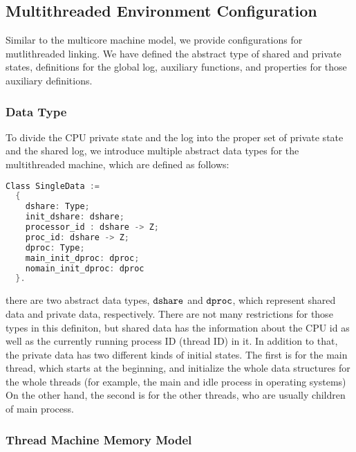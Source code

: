 
\subsection{Multithreaded Environment Configuration}
\label{chapter:linking:subsec:multithreaded-env-configuration}

Similar to the multicore machine model, we provide configurations 
for mutlithreaded linking. 
We have defined the abstract type of 
shared and private states, 
definitions for the global log, 
auxiliary functions,
and properties for those auxiliary definitions. 

\subsubsection{Data Type} 
To divide the CPU private state and the log into the proper set of private state and the shared log, we introduce 
multiple abstract data types for the multithreaded machine, which are defined as follows:
\begin{lstlisting}[language=C]
Class SingleData :=
  {
    dshare: Type;
    init_dshare: dshare;
    processor_id : dshare -> Z;
    proc_id: dshare -> Z;
    dproc: Type;
    main_init_dproc: dproc;
    nomain_init_dproc: dproc
  }.
\end{lstlisting} 
there are two abstract data types, ${\mathrm{\texttt{dshare}}}$ and ${\mathrm{\texttt{dproc}}}$, 
which represent shared data and private data, respectively. 
There are not many restrictions for those types in this definiton, 
but shared data has the information about the CPU id as well as the currently running process ID (thread ID) in it. 
In addition to that, 
the private data has two different kinds of initial states. 
The first is for the main thread, which starts at the beginning, 
and initialize the whole data structures for the whole  threads (for example, the main and idle process 
in operating systems)
On the other hand, the second is for the other threads, 
who are usually children of main process. 



\subsubsection{Thread Machine Memory Model}


